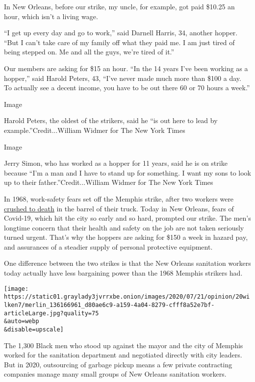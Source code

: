 In New Orleans, before our strike, my uncle, for example, got paid
\$10.25 an hour, which isn't a living wage.

``I get up every day and go to work,'' said Darnell Harris, 34, another
hopper. ``But I can't take care of my family off what they paid me. I am
just tired of being stepped on. Me and all the guys, we're tired of
it.''

Our members are asking for \$15 an hour. ``In the 14 years I've been
working as a hopper,'' said Harold Peters, 43, ``I've never made much
more than \$100 a day. To actually see a decent income, you have to be
out there 60 or 70 hours a week.''

Image

Harold Peters, the oldest of the strikers, said he ``is out here to lead
by example.''Credit...William Widmer for The New York Times

Image

Jerry Simon, who has worked as a hopper for 11 years, said he is on
strike because ``I'm a man and I have to stand up for something. I want
my sons to look up to their father.''Credit...William Widmer for The New
York Times

In 1968, work-safety fears set off the Memphis strike, after two workers
were
\href{https://www.theroot.com/watch-the-tragic-deaths-of-robert-walker-and-echol-col-1822619781}{crushed
to death} in the barrel of their truck. Today in New Orleans, fears of
Covid-19, which hit the city so early and so hard, prompted our strike.
The men's longtime concern that their health and safety on the job are
not taken seriously turned urgent. That's why the hoppers are asking for
\$150 a week in hazard pay, and assurances of a steadier supply of
personal protective equipment.

One difference between the two strikes is that the New Orleans
sanitation workers today actually have less bargaining power than the
1968 Memphis strikers had.

\texttt{[image: https://static01.graylady3jvrrxbe.onion/images/2020/07/21/opinion/20wilken7/merlin\_136166961\_d80ae6c9-a159-4a04-8279-cfff8a52e7bf-articleLarge.jpg?quality=75\\\&auto=webp\\\&disable=upscale]}

The 1,300 Black men who stood up against the mayor and the city of
Memphis worked for the sanitation department and negotiated directly
with city leaders. But in 2020, outsourcing of garbage pickup means a
few private contracting companies manage many small groups of New
Orleans sanitation workers.


